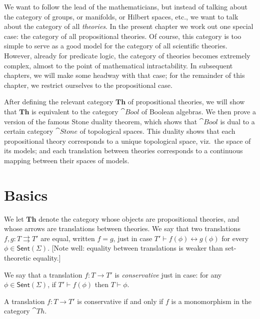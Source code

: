 We want to follow the lead of the mathematicians, but instead of
talking about the category of groups, or manifolds, or Hilbert spaces,
etc., we want to talk about the category of all {\it theories}.  In
the present chapter we work out one special case: the category of all
propositional theories.  Of course, this category is too simple to
serve as a good model for the category of all scientific theories.
However, already for predicate logic, the category of theories becomes
extremely complex, almost to the point of mathematical intractability.
In subsequent chapters, we will make some headway with that case; for
the remainder of this chapter, we restrict ourselves to the
propositional case.

After defining the relevant category $\mathbf{Th}$ of propositional
theories, we will show that $\mathbf{Th}$ is equivalent to the
category $\cat{Bool}$ of Boolean algebras.  We then prove a version of
the famous Stone duality theorem, which shows that $\cat{Bool}$ is
dual to a certain category $\cat{Stone}$ of topological spaces.  This
duality shows that each propositional theory corresponds to a unique
topological space, viz.\ the space of its models; and each translation
between theories corresponds to a continuous mapping between their
spaces of models.


\section{Basics}

\newcommand{\sg}{\mathsf{Sent}(\Sigma )}

\begin{defn} We let $\mathbf{Th}$ denote the category whose objects
  are propositional theories, and whose arrows are translations
  between theories.  We say that two translations
  $f,g:T\rightrightarrows T'$ are equal, written $f=g$, just in case
  $T'\vdash f(\phi )\leftrightarrow g(\phi )$ for every $\phi\in\sg$.
  [Note well: equality between translations is weaker than
  set-theoretic equality.]  \end{defn}

\begin{defn} We say that a translation $f:T\to T'$ is
  \emph{conservative} just in case: for any
  $\phi\in\mathsf{Sent}(\Sigma )$, if $T'\vdash f(\phi )$ then
  $T\vdash \phi$. \end{defn}

\begin{prop} A translation $f:T\to T'$ is conservative if and only if
  $f$ is a monomorphism in the category
  $\cat{Th}$. \label{test} \end{prop}

